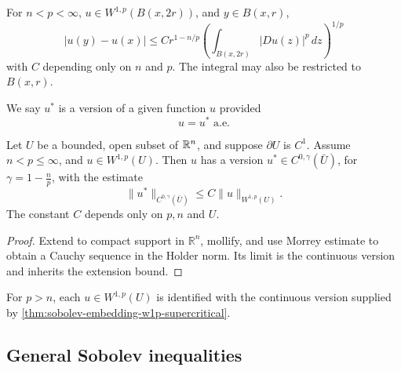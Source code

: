 \begin{remark}
\label{rem:morrey-estimate-on-ball}

For $n<p<\infty$, $u\in W^{1,p}(B(x,2r))$, and $y\in B(x,r)$,
$$|u(y) - u(x)| \le Cr^{1-n/p} \left( \int_{B(x,2r)} |Du(z)|^p\,dz \right)^{1/p}$$
with $C$ depending only on $n$ and $p$. The integral may also be restricted to $B(x,r)$.
\end{remark}

\begin{definition}
\label{def:version-of-a-function}
We say $u^*$ is a version of a given function $u$ provided
$$u = u^* \text{ a.e.}$$
\end{definition}

\begin{theorem}
\label{thm:sobolev-embedding-w1p-supercritical}

Let $U$ be a bounded, open subset of $\mathbb{R}^n$, and suppose $\partial U$ is $C^1$. Assume $n < p \le \infty$, and $u \in W^{1,p}(U)$. Then $u$ has a version $u^* \in C^{0,\gamma}(\bar{U})$, for $\gamma = 1 - \frac{n}{p}$, with the estimate
$$\|u^*\|_{C^{0,\gamma}(\bar{U})} \le C\|u\|_{W^{1,p}(U)}.$$
The constant $C$ depends only on $p, n$ and $U$.
\end{theorem}

\begin{proof}
\sketch Extend to compact support in $\mathbb R^n$, mollify, and use Morrey estimate to obtain a Cauchy sequence in the Holder norm. Its limit is the continuous version and inherits the extension bound.
\end{proof}

\begin{remark}
\label{rem:identify-continuous-version}

For $p>n$, each $u\in W^{1,p}(U)$ is identified with the continuous version supplied by \cref{thm:sobolev-embedding-w1p-supercritical}.
\end{remark}

\subsection{General Sobolev inequalities}


